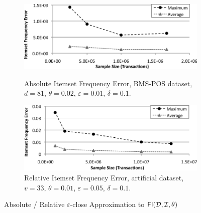 \begin{figure}[htb]
  \centering
  \begin{subfigure}[b]{\linewidth}
    \centering
    \includegraphics[width=0.75\linewidth]{vcmine/Fig2a}
    \caption{Absolute Itemset Frequency Error, BMS-POS dataset, $d=81$,
    $\theta=0.02$, $\varepsilon=0.01$, $\delta=0.1$.}
    {\label{fig:BMS-POS-absFI}}
  \end{subfigure}

 \begin{subfigure}[b]{\linewidth}
    \centering
    \includegraphics[width=0.75\linewidth]{vcmine/Fig2b}
    \caption{Relative Itemset Frequency Error, artificial dataset, $v=33$,
    $\theta=0.01$, $\varepsilon=0.05$, $\delta=0.1$.}
    \label{fig:artif-relFI}
  \end{subfigure}
  \caption{Absolute / Relative $\varepsilon$-close Approximation to
  $\mathsf{FI}({\cal D},{\cal I},\theta)$} 
  \label{fig:fiapprox}
\end{figure}

